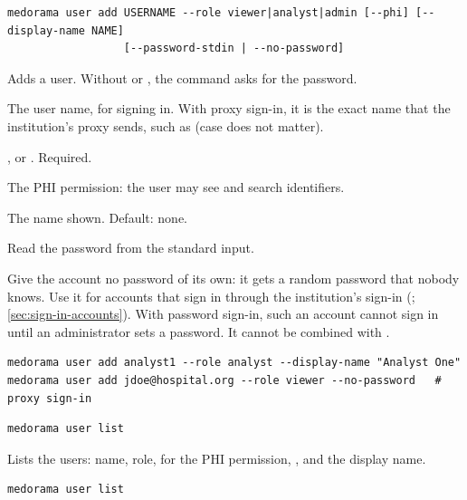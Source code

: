 \begin{lstlisting}[style=signature]
medorama user add USERNAME --role viewer|analyst|admin [--phi] [--display-name NAME]
                  [--password-stdin | --no-password]
\end{lstlisting}
Adds a user. Without  or , the command asks for the
password.
\begin{params}
\item[USERNAME] The user name, for signing in. With proxy sign-in, it is the exact name that the
  institution's proxy sends, such as  (case does not matter).
\item[--role ROLE] ,  or . Required.
\item[--phi] The PHI permission: the user may see and search identifiers.
\item[--display-name NAME] The name shown. Default: none.
\item[--password-stdin] Read the password from the standard input.
\item[--no-password] Give the account no password of its own: it gets a random password that
  nobody knows. Use it for accounts that sign in through the institution's sign-in
  (; \cref{sec:sign-in-accounts}). With password sign-in, such an
  account cannot sign in until an administrator sets a password. It cannot be combined with
  .
\end{params}
\begin{lstlisting}[style=shell]
medorama user add analyst1 --role analyst --display-name "Analyst One"
medorama user add jdoe@hospital.org --role viewer --no-password   # proxy sign-in
\end{lstlisting}

\begin{lstlisting}[style=signature]
medorama user list
\end{lstlisting}
Lists the users: name, role,  for the PHI permission, , and the display
name.
\begin{lstlisting}[style=shell]
medorama user list
\end{lstlisting}

